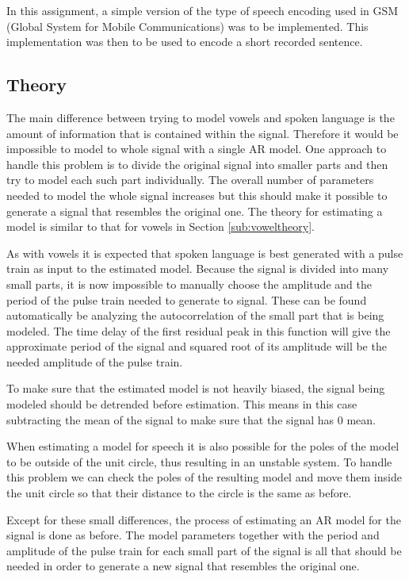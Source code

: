 \documentclass{IEEEtran}
\begin{document}
In this assignment, a simple version of the type of speech encoding used in GSM
(Global System for Mobile Communications) was to be implemented. This
implementation was then to be used to encode a short recorded sentence.

\subsection{Theory}
\label{sub:vimtheory}

The main difference between trying to model vowels and spoken language
is the amount of information that is contained within the signal.
Therefore it would be impossible to model to whole signal with a
single AR model. One approach to handle this problem is to divide
the original signal into smaller parts and then try to model each such
part individually. The overall number of parameters needed to model the
whole signal increases but this should make it possible to generate a
signal that resembles the original one. The theory for estimating a
model is similar to that for vowels in Section \ref{sub:voweltheory}.

As with vowels it is expected that spoken language is best generated
with a pulse train as input to the estimated model. Because the signal
is divided into many small parts, it is now impossible to manually choose
the amplitude and the period of the pulse train needed to generate to
signal. These can be found automatically be analyzing the autocorrelation
of the small part that is being modeled. The time delay of the first
residual peak in this function will give the approximate period of the
signal and squared root of its amplitude will be the needed amplitude of
the pulse train.

To make sure that the estimated model is not heavily biased, the signal
being modeled should be detrended before estimation. This means in this
case subtracting the mean of the signal to make sure that the
signal has $0$ mean.

When estimating a model for speech it is also possible for the poles
of the model to be outside of the unit circle, thus resulting in an
unstable system. To handle this problem we can check the poles of the
resulting model and move them inside the unit circle so that their
distance to the circle is the same as before.

Except for these small differences, the process of estimating an AR
model for the signal is done as before. The model parameters together
with the period and amplitude of the pulse train for each small part
of the signal is all that should be needed in order to generate a new
signal that resembles the original one.
\end{document}
